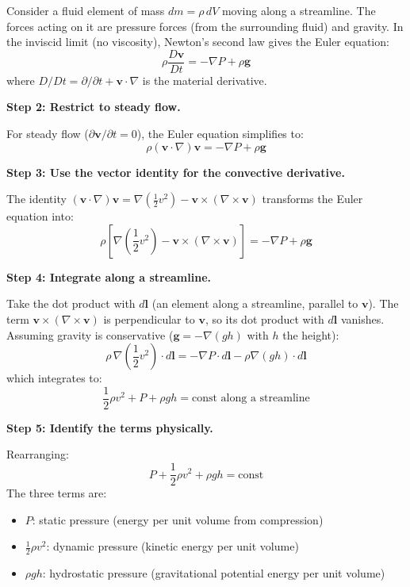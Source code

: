 \documentclass[11pt,openright]{book}
\begin{document}
Consider a fluid element of mass $dm = \rho\,dV$ moving along a streamline. The forces acting on it are pressure forces (from the surrounding fluid) and gravity. In the inviscid limit (no viscosity), Newton's second law gives the Euler equation:
\begin{equation}
\rho\frac{D\mathbf{v}}{Dt} = -\nabla P + \rho\mathbf{g}
\end{equation}
where $D/Dt = \partial/\partial t + \mathbf{v}\cdot\nabla$ is the material derivative.

\textbf{Step 2: Restrict to steady flow.}

For steady flow ($\partial\mathbf{v}/\partial t = 0$), the Euler equation simplifies to:
\begin{equation}
\rho(\mathbf{v}\cdot\nabla)\mathbf{v} = -\nabla P + \rho\mathbf{g}
\end{equation}

\textbf{Step 3: Use the vector identity for the convective derivative.}

The identity $(\mathbf{v}\cdot\nabla)\mathbf{v} = \nabla(\frac{1}{2}v^2) - \mathbf{v}\times(\nabla\times\mathbf{v})$ transforms the Euler equation into:
\begin{equation}
\rho\left[\nabla\left(\frac{1}{2}v^2\right) - \mathbf{v}\times(\nabla\times\mathbf{v})\right] = -\nabla P + \rho\mathbf{g}
\end{equation}

\textbf{Step 4: Integrate along a streamline.}

Take the dot product with $d\mathbf{l}$ (an element along a streamline, parallel to $\mathbf{v}$). The term $\mathbf{v}\times(\nabla\times\mathbf{v})$ is perpendicular to $\mathbf{v}$, so its dot product with $d\mathbf{l}$ vanishes. Assuming gravity is conservative ($\mathbf{g} = -\nabla(gh)$ with $h$ the height):
\begin{equation}
\rho\,\nabla\left(\frac{1}{2}v^2\right)\cdot d\mathbf{l} = -\nabla P\cdot d\mathbf{l} - \rho\nabla(gh)\cdot d\mathbf{l}
\end{equation}
which integrates to:
\begin{equation}
\frac{1}{2}\rho v^2 + P + \rho gh = \text{const along a streamline}
\end{equation}

\textbf{Step 5: Identify the terms physically.}

Rearranging:
\begin{equation}
P + \frac{1}{2}\rho v^2 + \rho gh = \text{const}
\end{equation}
The three terms are:
\begin{itemize}
\item $P$: static pressure (energy per unit volume from compression)
\item $\frac{1}{2}\rho v^2$: dynamic pressure (kinetic energy per unit volume)
\item $\rho gh$: hydrostatic pressure (gravitational potential energy per unit volume)
\end{itemize}
\end{document}
